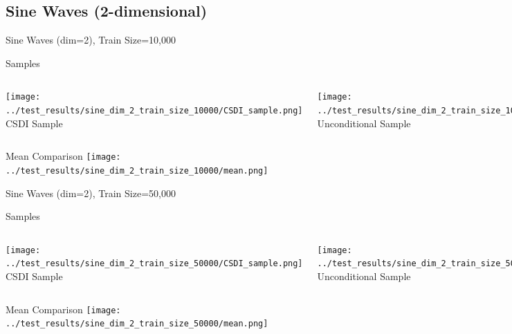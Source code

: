 \documentclass[8pt]{beamer}
\renewcommand{\|}{\ensuremath{\hspace{0.1cm} | \hspace{0.1cm}}}
\begin{document}
    \subsection{Sine Waves (2-dimensional)}

    \begin{frame}{Sine Waves (dim=2), Train Size=10,000}
    \begin{block}{Samples}
    \begin{columns}
        \centering
        \texttt{[image: ../test\_results/sine\_dim\_2\_train\_size\_10000/CSDI\_sample.png]}
        CSDI Sample
        
        \centering
        \texttt{[image: ../test\_results/sine\_dim\_2\_train\_size\_10000/UNCOND\_sample.png]}
        Unconditional Sample
    \end{columns}
    \end{block}

    \begin{block}{Mean Comparison}
    \centering
    \texttt{[image: ../test\_results/sine\_dim\_2\_train\_size\_10000/mean.png]}
    \end{block}
    \end{frame}

    \begin{frame}{Sine Waves (dim=2), Train Size=50,000}
    \begin{block}{Samples}
    \begin{columns}
        \centering
        \texttt{[image: ../test\_results/sine\_dim\_2\_train\_size\_50000/CSDI\_sample.png]}
        CSDI Sample
        
        \centering
        \texttt{[image: ../test\_results/sine\_dim\_2\_train\_size\_50000/UNCOND\_sample.png]}
        Unconditional Sample
    \end{columns}
    \end{block}

    \begin{block}{Mean Comparison}
    \centering
    \texttt{[image: ../test\_results/sine\_dim\_2\_train\_size\_50000/mean.png]}
    \end{block}
    \end{frame}
\end{document}
